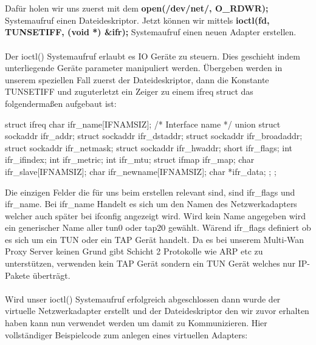 \\\\
Dafür holen wir uns zuerst mit dem \textbf{open(\dq/dev/net/\dq, O\_RDWR);} Systemaufruf einen Dateideskriptor. Jetzt können wir mittels \textbf{ioctl(fd, TUNSETIFF, (void *) \&ifr);} Systemaufruf einen neuen Adapter erstellen.
\\\\
Der ioctl() Systemaufruf erlaubt es IO Geräte zu steuern. Dies geschieht indem unterliegende Geräte parameter manipuliert werden. Übergeben werden in unserem speziellen Fall zuerst der Dateideskriptor, dann die Konstante TUNSETIFF und zuguterletzt ein Zeiger zu einem ifreq struct das folgendermaßen aufgebaut ist:

\begin{program}[H]
    \begin{CppCode}
        struct ifreq {
            char ifr_name[IFNAMSIZ]; /* Interface name */
            union {
                struct sockaddr ifr_addr;
                struct sockaddr ifr_dstaddr;
                struct sockaddr ifr_broadaddr;
                struct sockaddr ifr_netmask;
                struct sockaddr ifr_hwaddr;
                short           ifr_flags;
                int             ifr_ifindex;
                int             ifr_metric;
                int             ifr_mtu;
                struct ifmap    ifr_map;
                char            ifr_slave[IFNAMSIZ];
                char            ifr_newname[IFNAMSIZ];
                char           *ifr_data;
            };
        };
    \end{CppCode}
\end{program}
\noindent
Die einzigen Felder die für uns beim erstellen relevant sind, sind ifr\_flags und ifr\_name. Bei ifr\_name Handelt es sich um den Namen des Netzwerkadapters welcher auch später bei ifconfig angezeigt wird. Wird kein Name angegeben wird ein generischer Name aller tun0 oder tap20 gewählt. Wärend ifr\_flags definiert ob es sich um ein TUN oder ein TAP Gerät handelt. Da es bei unserem Multi-Wan Proxy Server keinen Grund gibt Schicht 2 Protokolle wie ARP etc zu unterstützen, verwenden kein TAP Gerät sondern ein TUN Gerät welches nur IP-Pakete überträgt. 
\\\\ 
Wird unser ioctl() Systemaufruf erfolgreich abgeschlossen dann wurde der virtuelle Netzwerkadapter erstellt und der Dateideskriptor den wir zuvor erhalten haben kann nun verwendet werden um damit zu Kommunizieren. Hier vollständiger Beispielcode zum anlegen eines virtuellen Adapters:
